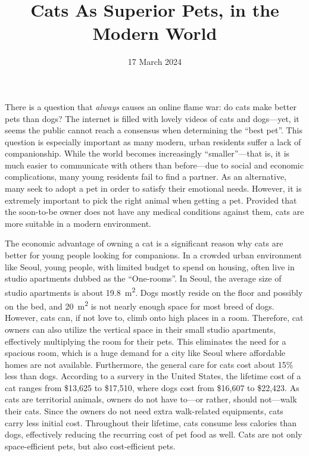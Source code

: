 \documentclass{mla}
\date{17 March 2024}
\title{Cats As Superior Pets, in the Modern World}
\begin{document}
\indent
\color{red}
There is a question that \textit{always} causes an online flame war: do cats make better pets than dogs?
\color{black}
The internet is filled with lovely videos of cats and dogs---yet, it seems the public cannot reach a consensus when determining the ``best pet''.
This question is especially important as many modern, urban residents suffer a lack of companionship.
While the world becomes increasingly ``smaller''---that is, it is much easier to communicate with others than before---due to social and economic complications, many young residents fail to find a partner.
As an alternative, many seek to adopt a pet in order to satisfy their emotional needs.
However, it is extremely important to pick the right animal when getting a pet.
Provided that the soon-to-be owner does not have any medical conditions against them,
\color{red}
cats are more suitable in a modern environment.

\color{green}
The economic advantage of owning a cat is a significant reason why cats are better for young people looking for companions.
\color{blue}
In a crowded urban environment like Seoul, young people, with limited budget to spend on housing, often live in studio apartments dubbed as the ``One-rooms''.
In Seoul, the average size of studio apartments is about \SI{19.8}{\square\m}.
Dogs mostly reside on the floor and possibly on the bed, and \SI{20}{\square\m} is not nearly enough space for most breed of dogs.
However, cats can, if not love to, climb onto high places in a room.
Therefore, cat owners can also utilize the vertical space in their small studio apartments, effectively multiplying the room for their pets.
This eliminates the need for a spacious room, which is a huge demand for a city like Seoul where affordable homes are not available.
Furthermore, the general care for cats cost about 15\% less than dogs.
According to a survery in the United States, the lifetime cost of a cat ranges from \$13,625 to \$17,510, where dogs cost from \$16,607 to \$22,423.
As cats are territorial animals, owners do not have to---or rather, should not---walk their cats.
Since the owners do not need extra walk-related equipments, cats carry less initial cost.
Throughout their lifetime, cats consume less calories than dogs, effectively reducing the recurring cost of pet food as well.
Cats are not only space-efficient pets, but also cost-efficient pets.
\end{document}
